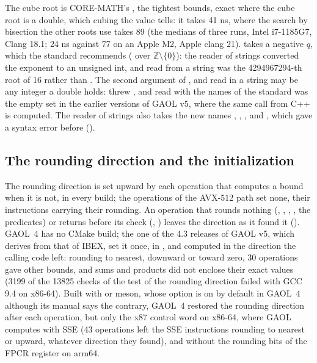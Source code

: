 \medskip
The cube root  is CORE-MATH's , the
tightest bounds, exact where the cube root is a double, which cubing the
value tells: it takes 41 ns, where the search by bisection the other roots
use takes 89 (the medians of three runs, Intel i7-1185G7, Clang 18.1; 24 ns
against 77 on an Apple M2, Apple clang 21).\newinvfive{}  takes
a negative $q$, which the standard recommends ( over
$\mathbb{Z}\setminus\{0\}$): the reader of strings converted the exponent to
an unsigned int, and  read from a string was the
4294967294-th root of 16 rather than . The second argument of
,  and  read in a string may be any
integer a double holds:  threw
, and  read with the
names of the standard was the empty set in the earlier versions of GAOL v5,
where the same call from C++ is computed. The reader of strings also takes the new names ,
, ,  and , which gave a syntax
error before ().

\subsection{The rounding direction and the initialization}
\label{sec:changes-rounding}
%

The rounding direction is set upward by each operation that computes a bound
when it is not, in every build; the operations of the AVX-512 path set none,
their instructions carrying their rounding.\newinvfive{} An operation that
rounds nothing (, , , , the
predicates) or returns before its check (,
) leaves the direction as it found it
(). GAOL~4 has no CMake build; the one of the 4.3
releases of GAOL v5, which derives from that of IBEX, set it once, in
, and computed in the direction the calling code left:
rounding to nearest, downward or toward zero, 30 operations gave other
bounds, and sums and products did not enclose their exact values (3199 of the
13825 checks of the test of the rounding direction failed with GCC 9.4 on
x86-64). Built with  or meson, whose option
 is on by default in GAOL~4 although its
manual says the contrary, GAOL~4 restored the rounding direction after each
operation, but only the x87 control word on x86-64,
where GAOL computes with SSE (43 operations left the SSE instructions
rounding to nearest or upward, whatever direction they found), and without
the rounding bits of the FPCR register on arm64.

